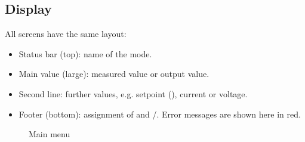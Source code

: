 \subsection{Display}
All screens have the same layout:
\begin{itemize}
    \item Status bar (top): name of the mode.
    \item Main value (large): measured value or output value.
    \item Second line: further values, e.g. setpoint (), current or voltage.
    \item Footer (bottom): assignment of  and /. Error messages are shown here in red.
\end{itemize}
\begin{figure}[h!]
    \centering
    \caption{Main menu}
    \label{fig:idle}
\end{figure}
